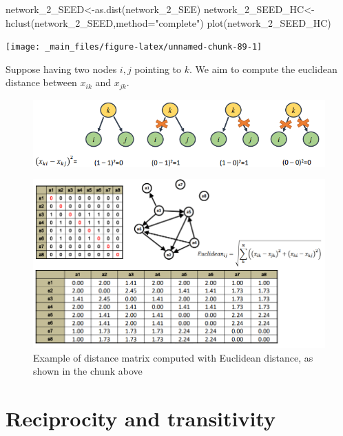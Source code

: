 \documentclass[
  notitlepage,
  onecolumn,
  openany]{book}
\newenvironment{Shaded}{\begin{snugshade}}{\end{snugshade}}
\newcommand{\AttributeTok}[1]{\textcolor[rgb]{0.77,0.63,0.00}{#1}}
\newcommand{\FunctionTok}[1]{\textcolor[rgb]{0.00,0.00,0.00}{#1}}
\newcommand{\NormalTok}[1]{#1}
\newcommand{\OtherTok}[1]{\textcolor[rgb]{0.56,0.35,0.01}{#1}}
\newcommand{\StringTok}[1]{\textcolor[rgb]{0.31,0.60,0.02}{#1}}
\begin{document}
\begin{Shaded}
\begin{Highlighting}[]
\NormalTok{network\_2\_SEED}\OtherTok{\textless{}{-}}\FunctionTok{as.dist}\NormalTok{(network\_2\_SEE)}
\NormalTok{network\_2\_SEED\_HC}\OtherTok{\textless{}{-}}\FunctionTok{hclust}\NormalTok{(network\_2\_SEED,}\AttributeTok{method=}\StringTok{"complete"}\NormalTok{)}
\FunctionTok{plot}\NormalTok{(network\_2\_SEED\_HC)}
\end{Highlighting}
\end{Shaded}

\texttt{[image: \_main\_files/figure-latex/unnamed-chunk-89-1]}

Suppose having two nodes \(i,j\) pointing to \(k\). We aim to compute the euclidean distance between \(x_{ik}\) and \(x_{jk}\).

\begin{figure}[h!]

{\centering \includegraphics[width=0.7\linewidth]{images/11-Subgroups and Structural Equivalence/Untitled 9} 

}

\end{figure}

\begin{figure}[h!]

{\centering \includegraphics[width=0.7\linewidth]{images/11-Subgroups and Structural Equivalence/Untitled 10} 

}

\caption{Example of distance matrix computed with Euclidean distance, as shown in the chunk above}\label{fig:unnamed-chunk-91}
\end{figure}

\hypertarget{reciprocity-and-transitivity}{%
\chapter{Reciprocity and transitivity}\label{reciprocity-and-transitivity}}
\end{document}
